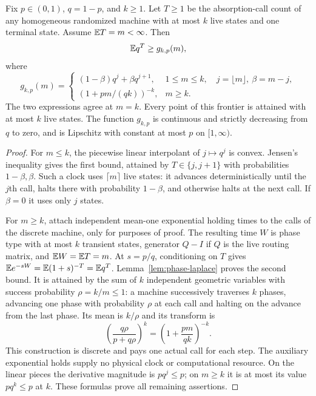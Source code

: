 \begin{lemma}\label{lem:discrete-clock}
Fix $p\in(0,1)$, $q=1-p$, and $k\ge1$. Let $T\ge1$ be the absorption-call count of any homogeneous randomized machine with at most $k$ live states and one terminal state. Assume $\mathbb E T=m<\infty$. Then
\begin{equation}\label{eq:clock-frontier-bound}
 \mathbb E q^T\ge g_{k,p}(m),
\end{equation}
where
\begin{equation}\label{eq:clock-frontier}
 g_{k,p}(m)=
 \begin{cases}
 (1-\beta)q^j+\beta q^{j+1},
    &1\le m\le k,\quad j=\lfloor m\rfloor,
      \ \beta=m-j,\\[2pt]
 (1+pm/(qk))^{-k},&m\ge k.
 \end{cases}
\end{equation}
The two expressions agree at $m=k$. Every point of this frontier is attained with at most $k$ live states. The function $g_{k,p}$ is continuous and strictly decreasing from $q$ to zero, and is Lipschitz with constant at most $p$ on $[1,\infty)$.
\end{lemma}
\begin{proof}
For $m\le k$, the piecewise linear interpolant of $j\mapsto q^j$ is convex. Jensen's inequality gives the first bound, attained by $T\in\{j,j+1\}$ with probabilities $1-\beta,\beta$. Such a clock uses $\lceil m\rceil$ live states: it advances deterministically until the $j$th call, halts there with probability $1-\beta$, and otherwise halts at the next call. If $\beta=0$ it uses only $j$ states.

For $m\ge k$, attach independent mean-one exponential holding times to the calls of the discrete machine, only for purposes of proof. The resulting time $W$ is phase type with at most $k$ transient states, generator $Q-I$ if $Q$ is the live routing matrix, and $\mathbb E W=\mathbb E T=m$. At $s=p/q$, conditioning on $T$ gives
$\mathbb E e^{-sW}=\mathbb E(1+s)^{-T}=\mathbb E q^T$. Lemma~\ref{lem:phase-laplace} proves the second bound. It is attained by the sum of $k$ independent geometric variables with success probability $\rho=k/m\le1$: a machine successively traverses $k$ phases, advancing one phase with probability $\rho$ at each call and halting on the advance from the last phase. Its mean is $k/\rho$ and its transform is
\[
 \left(\frac{q\rho}{p+q\rho}\right)^k
 =\left(1+\frac{pm}{qk}\right)^{-k}.
\]
This construction is discrete and pays one actual call for each step. The auxiliary exponential holds supply no physical clock or computational resource. On the linear pieces the derivative magnitude is $pq^j\le p$; on $m\ge k$ it is at most its value $pq^k\le p$ at $k$. These formulas prove all remaining assertions.
\end{proof}

